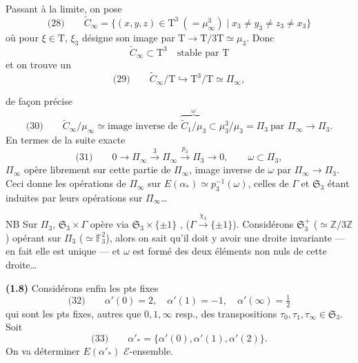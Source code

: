 \documentclass[11pt,a4paper]{article}
\begin{document}

Passant à la limite, on pose
\[
  \text{(28)} \qquad \widetilde{C}_\infty = \{(x, y, z) \in \mathrm{T}^{3} \ (= \mu_\infty^{3}) \mid x_3 \neq y_3 \neq z_3 \neq x_3\}
\]
où pour $\xi \in \mathrm{T}$, $\xi_3$ désigne son image par $\mathrm{T} \to \mathrm{T}/3\mathrm{T} \simeq \mu_3$. Donc
\[
  \widetilde{C}_\infty \subset \mathrm{T}^{3} \quad \text{stable par } \mathrm{T}
\]
et on trouve un \ill{}
\[
  \text{(29)} \qquad \widetilde{C}_\infty/\mathrm{T} \hookrightarrow \mathrm{T}^{3}/\mathrm{T} \simeq \Pi_\infty ,
\]

de façon précise
\[
  \text{(30)} \qquad \widetilde{C}_\infty/\mu_\infty \simeq \text{image inverse de } \overbrace{\widetilde{C}_1/\mu_3}^{\omega} \subset \mu_3^{3}/\mu_3 = \Pi_3 \ \text{par } \Pi_\infty \to \Pi_3 .
\]
En termes de la suite exacte
\[
  \text{(31)} \qquad 0 \longrightarrow \Pi_\infty \xrightarrow{\ 3\ } \Pi_\infty \xrightarrow{\ p_3\ } \Pi_3 \longrightarrow 0, \qquad \omega \subset \Pi_3,
\]
$\Pi_\infty$ opère librement sur cette partie de $\Pi_\infty$, image inverse de $\omega$ par $\Pi_\infty \to \Pi_3$. Ceci donne les opérations de $\Pi_\infty$ sur $E(\alpha_{*}) \simeq p_3^{-1}(\omega)$, celles de $\Gamma$ et $\mathfrak{S}_3$ étant induites par leurs opérations sur $\Pi_\infty$\ldots

NB Sur $\Pi_3$,  $\mathfrak{S}_3 \times \Gamma$ opère via $\mathfrak{S}_3 \times \{\pm 1\}$ , ($\Gamma \xrightarrow{\chi_3} \{\pm 1\}$). Considérons $\mathfrak{S}_3^{+}$ ($\simeq \mathbb{Z}/3\mathbb{Z}$) opérant sur $\Pi_3$ ($\simeq \mathbb{F}_3^{2}$), alors on sait qu'il doit y avoir une droite invariante ---  en fait elle est unique --- et $\omega$ est formé des deux éléments non nuls de cette droite\ldots

\textbf{(1.8)} Considérons enfin les pts fixes
\[
  \text{(32)} \qquad \alpha'(0) = 2, \quad \alpha'(1) = -1, \quad \alpha'(\infty) = \tfrac12
\]
qui sont les pts fixes, autres que $0, 1, \infty$ resp., des transpositions $\tau_0, \tau_1, \tau_\infty \in \mathfrak{S}_3$.
Soit
\[
  \text{(33)} \qquad \alpha'_{*} = \{\alpha'(0), \alpha'(1), \alpha'(2)\} .
\]
On va déterminer $E(\alpha'_{*})$  $\mathcal{E}$-ensemble.
\end{document}
